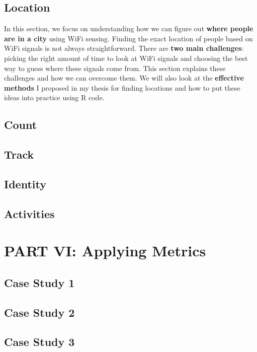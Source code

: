 \documentclass[
  letterpaper,
]{scrbook}
\begin{document}
\chapter{Location}\label{location}

In this section, we focus on understanding how we can figure out
\textbf{where people are in a city} using WiFi sensing. Finding the
exact location of people based on WiFi signals is not always
straightforward. There are \textbf{two main challenges}: picking the
right amount of time to look at WiFi signals and choosing the best way
to guess where these signals come from. This section explains these
challenges and how we can overcome them. We will also look at the
\textbf{effective methods} I proposed in my thesis for finding locations
and how to put these ideas into practice using R code.

\chapter{Count}\label{count}

\chapter{Track}\label{track}

\chapter{Identity}\label{identity}

\chapter{Activities}\label{activities}

\part{PART VI: Applying Metrics}

\chapter{Case Study 1}\label{case-study-1}

\chapter{Case Study 2}\label{case-study-2}

\chapter{Case Study 3}\label{case-study-3}
\end{document}
